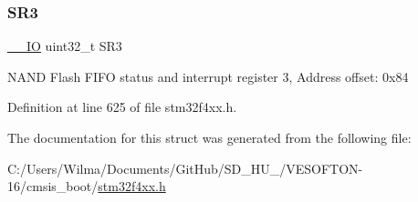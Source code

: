 \subsubsection{\texorpdfstring{S\+R3}{SR3}}
{\footnotesize\ttfamily \hyperlink{group___c_m_s_i_s__core__definitions_gaec43007d9998a0a0e01faede4133d6be}{\+\_\+\+\_\+\+IO} uint32\+\_\+t S\+R3}

N\+A\+ND Flash F\+I\+FO status and interrupt register 3, Address offset\+: 0x84 

Definition at line 625 of file stm32f4xx.\+h.



The documentation for this struct was generated from the following file\+:\begin{DoxyCompactItemize}
\item 
C\+:/\+Users/\+Wilma/\+Documents/\+Git\+Hub/\+S\+D\+\_\+\+H\+U\+\_/\+V\+E\+S\+O\+F\+T\+O\+N-\/16/cmsis\+\_\+boot/\hyperlink{stm32f4xx_8h}{stm32f4xx.\+h}\end{DoxyCompactItemize}
